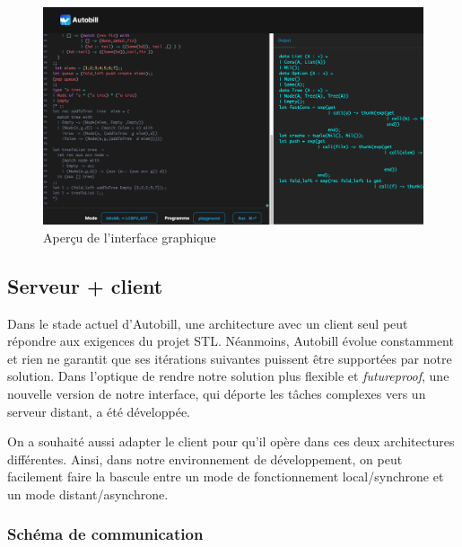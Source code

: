 \documentclass[12pt]{article}
\begin{document}
\begin{figure}
  \centering
  \includegraphics{Figures/screen.png}
  \caption{Aperçu de l'interface graphique}
\end{figure}

\newpage

\hypertarget{serveur-client}{%
  \subsection{Serveur + client}\label{serveur-client}}

Dans le stade actuel d'Autobill, une architecture avec un client seul
peut répondre aux exigences du projet STL. Néanmoins, Autobill évolue
constamment et rien ne garantit que ses itérations suivantes puissent
être supportées par notre solution. Dans l'optique de rendre notre
solution plus flexible et \emph{futureproof}, une nouvelle version de
notre interface, qui déporte les tâches complexes vers un serveur
distant, a été développée.

On a souhaité aussi adapter le client pour qu'il opère dans ces deux
architectures différentes. Ainsi, dans notre environnement de
développement, on peut facilement faire la bascule entre un mode de
fonctionnement local/synchrone et un mode distant/asynchrone.

\hypertarget{schuxe9ma-de-communication}{%
  \subsubsection{Schéma de
    communication}\label{schuxe9ma-de-communication}}
\end{document}
